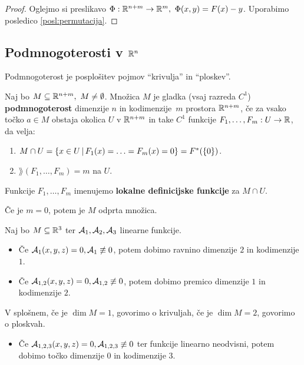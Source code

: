 \begin{proof}
    Oglejmo si preslikavo \(\Phi: \mathbb{R}^{n + m} \to \mathbb{R}^m, \ \Phi(x, y) = F(x) - y\). Uporabimo posledico \ref{posl:permutacija}.
\end{proof}

\subsection{Podmnogoterosti v $\mathbb{R}^n$}
Podmnogoterost je posplošitev pojmov "`krivulja"' in "`ploskev"'.

\begin{definicija}
    Naj bo $M \subseteq \mathbb{R}^{n+m}, \ M \neq \emptyset$. Množica $M$ je gladka (vsaj razreda $C^1$) \textbf{podmnogoterost} dimenzije $n$ in kodimenzije~$m$ prostora $\mathbb{R}^{n+m}$, če 
    za vsako točko $a \in M$ obstaja okolica $U$ v $\mathbb{R}^{n+m}$ in take $C^1$ funkcije $F_1, \ldots, F_m: U \to \mathbb{R}$, da velja:
    \begin{enumerate}
        \item $M \cap U = \left\{x \in U \,|\, F_1(x) = \ldots = F_m(x) = 0\right\} = F^*(\left\{0\right\})$.
        \item $\rang(F_1, \ldots, F_m) = m$ na $U$.
    \end{enumerate}
\end{definicija}

\begin{opomba}
    Funkcije $F_1, \ldots, F_m$ imenujemo \textbf{lokalne definicijske funkcije} za $M \cap U$.
\end{opomba}

\begin{opomba}
    Če je \(m = 0\), potem je \(M\) odprta množica. 
\end{opomba}

\begin{zgled}
    Naj bo \(M \subseteq \mathbb{R}^3\) ter \(\mathcal{A}_1, \mathcal{A}_2, \mathcal{A}_3\) linearne funkcije. 

    \begin{itemize}
        \item Če \(\mathcal{A}_1(x, y, z) = 0, \mathcal{A}_1 \not \equiv 0\), potem dobimo ravnino dimenzije \(2\) in kodimenzije \(1\).
        \item Če \(\mathcal{A}_{1, 2}(x, y, z) = 0, \mathcal{A}_{1, 2} \not \equiv 0\), potem dobimo premico dimenzije \(1\) in kodimenzije \(2\).
    \end{itemize}
    V splošnem, če je \(\dim M = 1\), govorimo o krivuljah, če je \(\dim M = 2\), govorimo o ploskvah.
    \begin{itemize}
        \item Če \(\mathcal{A}_{1, 2, 3}(x, y, z) = 0, \mathcal{A}_{1, 2, 3} \not \equiv 0\) ter funkcije linearno neodvisni, potem dobimo točko dimenzije \(0\) in kodimenzije \(3\).
    \end{itemize}
\end{zgled}


